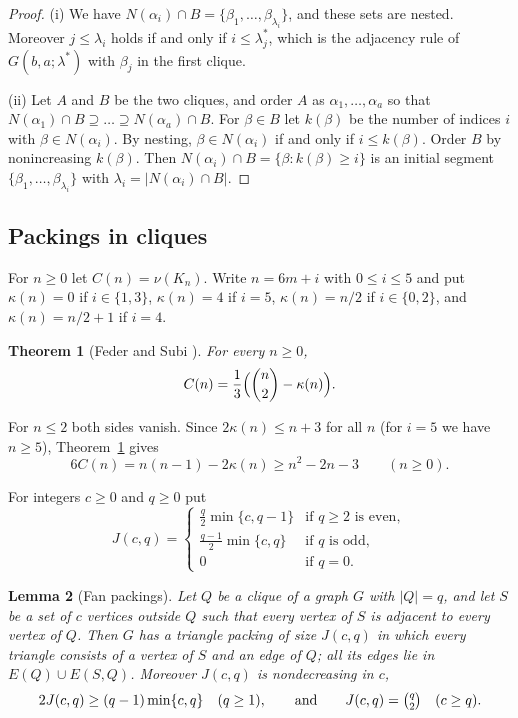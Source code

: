 \documentclass{amsart}
\newtheorem{theorem}{Theorem}[section]
\newtheorem{lemma}[theorem]{Lemma}
\theoremstyle{definition}
\numberwithin{equation}{section}
\numberwithin{table}{section}
\newcommand{\binomtwo}[1]{\tbinom{#1}{2}}
\begin{document}
\begin{proof}
(i) We have $N(\alpha_i)\cap B=\{\beta_1,\dots,\beta_{\lambda_i}\}$, and these sets are nested. Moreover $j\le\lambda_i$ holds if and only if $i\le\lambda^*_j$, which is the adjacency rule of $G(b,a;\lambda^*)$ with $\beta_j$ in the first clique.

(ii) Let $A$ and $B$ be the two cliques, and order $A$ as $\alpha_1,\dots,\alpha_a$ so that $N(\alpha_1)\cap B\supseteq\dots\supseteq N(\alpha_a)\cap B$. For $\beta\in B$ let $k(\beta)$ be the number of indices $i$ with $\beta\in N(\alpha_i)$. By nesting, $\beta\in N(\alpha_i)$ if and only if $i\le k(\beta)$. Order $B$ by nonincreasing $k(\beta)$. Then $N(\alpha_i)\cap B=\{\beta:k(\beta)\ge i\}$ is an initial segment $\{\beta_1,\dots,\beta_{\lambda_i}\}$ with $\lambda_i=|N(\alpha_i)\cap B|$.
\end{proof}

\subsection{Packings in cliques}
For $n\ge 0$ let $C(n)=\nu(K_n)$. Write $n=6m+i$ with $0\le i\le 5$ and put $\kappa(n)=0$ if $i\in\{1,3\}$, $\kappa(n)=4$ if $i=5$, $\kappa(n)=n/2$ if $i\in\{0,2\}$, and $\kappa(n)=n/2+1$ if $i=4$.

\begin{theorem}[{Feder and Subi \cite[Theorem~2]{FS12}}]\label{thm:FS}
For every $n\ge 0$,
\[
C(n)=\frac{1}{3}\Bigl(\binom{n}{2}-\kappa(n)\Bigr).
\]
\end{theorem}

For $n\le 2$ both sides vanish. Since $2\kappa(n)\le n+3$ for all $n$ (for $i=5$ we have $n\ge 5$), Theorem~\ref{thm:FS} gives
\begin{equation}\label{eq:Cbound}
6C(n)=n(n-1)-2\kappa(n)\ge n^2-2n-3\qquad(n\ge 0).
\end{equation}

For integers $c\ge 0$ and $q\ge 0$ put
\[
J(c,q)=
\begin{cases}
\frac{q}{2}\min\{c,q-1\} & \text{if $q\ge 2$ is even},\\[2pt]
\frac{q-1}{2}\min\{c,q\} & \text{if $q$ is odd},\\[2pt]
0 & \text{if $q=0$}.
\end{cases}
\]

\begin{lemma}[Fan packings]\label{lem:fan}
Let $Q$ be a clique of a graph $G$ with $|Q|=q$, and let $S$ be a set of $c$ vertices outside $Q$ such that every vertex of $S$ is adjacent to every vertex of $Q$. Then $G$ has a triangle packing of size $J(c,q)$ in which every triangle consists of a vertex of $S$ and an edge of $Q$; all its edges lie in $E(Q)\cup E(S,Q)$. Moreover $J(c,q)$ is nondecreasing in $c$,
\begin{equation}\label{eq:Jbound}
2J(c,q)\ge (q-1)\min\{c,q\}\quad(q\ge 1),\qquad\text{and}\qquad J(c,q)=\binomtwo{q}\quad(c\ge q).
\end{equation}
\end{lemma}
\end{document}
